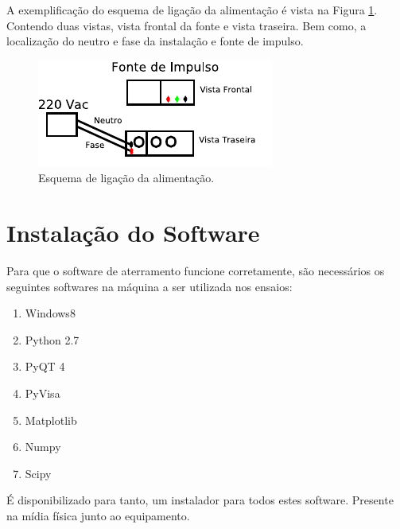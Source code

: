 \documentclass[a4paper, 10pt]{article}
\begin{document}
A exemplificação do esquema de ligação da alimentação é vista na Figura \ref{fig_esquema_ligacao_alimentacao}. Contendo duas vistas, vista frontal da fonte e vista
traseira. Bem como, a localização do neutro e fase da instalação e fonte de impulso.

\begin{figure}[!h]
        \caption{\label{fig_esquema_ligacao_alimentacao} Esquema de ligação da alimentação.}
	    \begin{center}
            \includegraphics[scale=1.2]{../fotos/conexoes/alimentacao.pdf}
	    \end{center}
\end{figure}




\section{Instalação do Software}

Para que o software de aterramento funcione corretamente, 
são necessários os seguintes softwares na máquina a ser utilizada nos ensaios:

\begin{enumerate}
    \item Windows8
    \item Python 2.7
    \item PyQT 4
    \item PyVisa
    \item Matplotlib
    \item Numpy
    \item Scipy
\end{enumerate}

É disponibilizado para tanto, um instalador para todos estes software. Presente 
na mídia física junto ao equipamento. 
\end{document}
